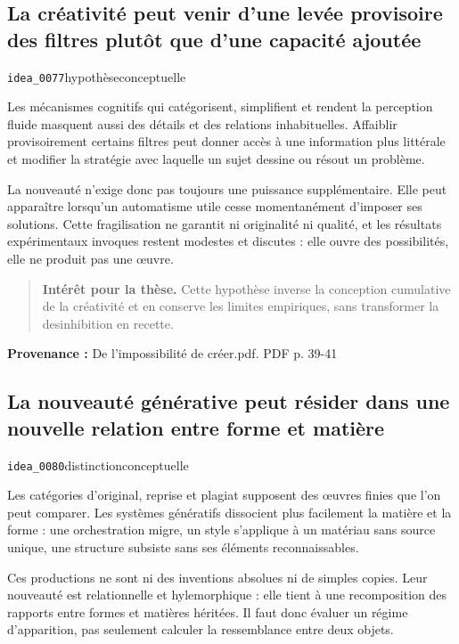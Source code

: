 \documentclass[10pt,a4paper]{article}
\begin{document}
\subsection{La créativité peut venir d'une levée provisoire des filtres plutôt que d'une capacité ajoutée}
{\small\color{metadata} \texttt{idea\_0077}\quad\textbullet\quad hypothèse\quad\textbullet\quad conceptuelle\par}

Les mécanismes cognitifs qui catégorisent, simplifient et rendent la perception fluide masquent aussi des détails et des relations inhabituelles. Affaiblir provisoirement certains filtres peut donner accès à une information plus littérale et modifier la stratégie avec laquelle un sujet dessine ou résout un problème.

La nouveauté n'exige donc pas toujours une puissance supplémentaire. Elle peut apparaître lorsqu'un automatisme utile cesse momentanément d'imposer ses solutions. Cette fragilisation ne garantit ni originalité ni qualité, et les résultats expérimentaux invoques restent modestes et discutes : elle ouvre des possibilités, elle ne produit pas une œuvre.

\begin{quote}
\textbf{Intérêt pour la thèse.} Cette hypothèse inverse la conception cumulative de la créativité et en conserve les limites empiriques, sans transformer la desinhibition en recette.
\end{quote}
{\footnotesize\color{metadata}\textbf{Provenance :} De l'impossibilité de créer.pdf. PDF p. 39-41\par}

\subsection{La nouveauté générative peut résider dans une nouvelle relation entre forme et matière}
{\small\color{metadata} \texttt{idea\_0080}\quad\textbullet\quad distinction\quad\textbullet\quad conceptuelle\par}

Les catégories d'original, reprise et plagiat supposent des œuvres finies que l'on peut comparer. Les systèmes génératifs dissocient plus facilement la matière et la forme : une orchestration migre, un style s'applique à un matériau sans source unique, une structure subsiste sans ses éléments reconnaissables.

Ces productions ne sont ni des inventions absolues ni de simples copies. Leur nouveauté est relationnelle et hylemorphique : elle tient à une recomposition des rapports entre formes et matières héritées. Il faut donc évaluer un régime d'apparition, pas seulement calculer la ressemblance entre deux objets.
\end{document}
